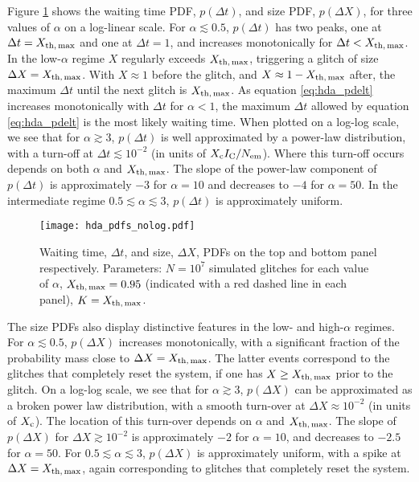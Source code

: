 Figure \ref{fig:hda_pdfs_nolog} shows the waiting time PDF, $p(\Delta t)$, and size PDF, $p(\Delta X)$, for three values of $\alpha$ on a log-linear scale. For $\alpha \lesssim 0.5$, $p(\Delta t)$ has two peaks, one at $\Delta t = X_{\rm th,\,max}$ and one at $\Delta t = 1$, and increases monotonically for $\Delta t < X_{\rm th,\,max}$. In the low-$\alpha$ regime $X$ regularly exceeds $X_{\rm th,\,max}$, triggering a glitch of size $\Delta X = X_{\rm th,\,max}$. With $X \approx 1$ before the glitch, and $X \approx 1 - X_{\rm th,\,max}$ after, the maximum $\Delta t$ until the next glitch is $X_{\rm th,\,max}$. As equation \eqref{eq:hda_pdelt} increases monotonically with $\Delta t$ for $\alpha < 1$, the maximum $\Delta t$ allowed by equation \eqref{eq:hda_pdelt} is the most likely waiting time. When plotted on a log-log scale, we see that for $\alpha \gtrsim 3$, $p(\Delta t)$ is well approximated by a power-law distribution, with a turn-off at $\Delta t \lesssim 10^{-2}$ (in units of $X_\textrm{c} I_{\rm C} / N_{\rm em}$). Where this turn-off occurs depends on both $\alpha$ and $X_{\rm th,\,max}$. The slope of the power-law component of $p(\Delta t)$ is approximately $-3$ for $\alpha=10$ and decreases to $-4$ for $\alpha=50$. In the intermediate regime $0.5 \lesssim \alpha \lesssim 3$, $p(\Delta t)$ is approximately uniform.

\begin{figure}
\centering
\texttt{[image: hda\_pdfs\_nolog.pdf]}
\caption{Waiting time, $\Delta t$, and size, $\Delta X$, PDFs on the top and bottom panel respectively. Parameters: $N=10^7$ simulated glitches for each value of $\alpha$, $X_{\rm th,\,max}=0.95$ (indicated with a red dashed line in each panel), $K=X_{\rm th,\,max}$. \label{fig:hda_pdfs_nolog}}
\end{figure}

The size PDFs also display distinctive features in the low- and high-$\alpha$ regimes. For $\alpha \lesssim 0.5$, $p(\Delta X)$ increases monotonically, with a significant fraction of the probability mass close to $\Delta X = X_{\rm th,\,max}$. The latter events correspond to the glitches that completely reset the system, if one has $X \geq X_{\rm th,\,max}$ prior to the glitch. On a log-log scale, we see that for $\alpha \gtrsim 3$, $p(\Delta X)$ can be approximated as a broken power law distribution, with a smooth turn-over at $\Delta X \approx 10^{-2}$ (in units of $X_\textrm{c}$). The location of this turn-over depends on $\alpha$ and $X_{\rm th,\,max}$. The slope of $p(\Delta X)$ for $\Delta X \gtrsim 10^{-2}$ is approximately $-2$ for $\alpha=10$, and decreases to $-2.5$ for $\alpha=50$. For $0.5 \lesssim \alpha \lesssim 3$, $p(\Delta X)$ is approximately uniform, with a spike at $\Delta X = X_{\rm th,\,max}$, again corresponding to glitches that completely reset the system.

